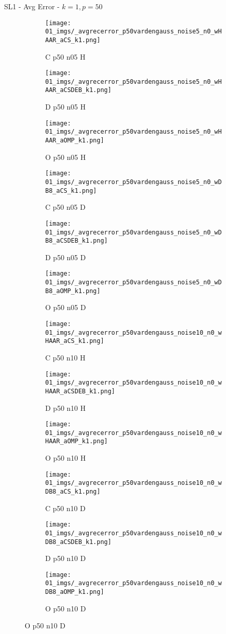\begin{frame}{SL1 - Avg Error - $k=1,p=50$}{}
\begin{figure}
\begin{subfigure}{0.13\textwidth}
\texttt{[image: 01\_imgs/\_avgrecerror\_p50vardengauss\_noise5\_n0\_wHAAR\_aCS\_k1.png]}
\caption*{\tiny C p50 n05 H}
\end{subfigure}
\begin{subfigure}{0.13\textwidth}
\texttt{[image: 01\_imgs/\_avgrecerror\_p50vardengauss\_noise5\_n0\_wHAAR\_aCSDEB\_k1.png]}
\caption*{\tiny D p50 n05 H}
\end{subfigure}
\begin{subfigure}{0.13\textwidth}
\texttt{[image: 01\_imgs/\_avgrecerror\_p50vardengauss\_noise5\_n0\_wHAAR\_aOMP\_k1.png]}
\caption*{\tiny O p50 n05 H}
\end{subfigure}
\begin{subfigure}{0.13\textwidth}
\texttt{[image: 01\_imgs/\_avgrecerror\_p50vardengauss\_noise5\_n0\_wDB8\_aCS\_k1.png]}
\caption*{\tiny C p50 n05 D}
\end{subfigure}
\begin{subfigure}{0.13\textwidth}
\texttt{[image: 01\_imgs/\_avgrecerror\_p50vardengauss\_noise5\_n0\_wDB8\_aCSDEB\_k1.png]}
\caption*{\tiny D p50 n05 D}
\end{subfigure}
\begin{subfigure}{0.13\textwidth}
\texttt{[image: 01\_imgs/\_avgrecerror\_p50vardengauss\_noise5\_n0\_wDB8\_aOMP\_k1.png]}
\caption*{\tiny O p50 n05 D}
\end{subfigure}

\vspace{5pt}

\begin{subfigure}{0.13\textwidth}
\texttt{[image: 01\_imgs/\_avgrecerror\_p50vardengauss\_noise10\_n0\_wHAAR\_aCS\_k1.png]}
\caption*{\tiny C p50 n10 H}
\end{subfigure}
\begin{subfigure}{0.13\textwidth}
\texttt{[image: 01\_imgs/\_avgrecerror\_p50vardengauss\_noise10\_n0\_wHAAR\_aCSDEB\_k1.png]}
\caption*{\tiny D p50 n10 H}
\end{subfigure}
\begin{subfigure}{0.13\textwidth}
\texttt{[image: 01\_imgs/\_avgrecerror\_p50vardengauss\_noise10\_n0\_wHAAR\_aOMP\_k1.png]}
\caption*{\tiny O p50 n10 H}
\end{subfigure}
\begin{subfigure}{0.13\textwidth}
\texttt{[image: 01\_imgs/\_avgrecerror\_p50vardengauss\_noise10\_n0\_wDB8\_aCS\_k1.png]}
\caption*{\tiny C p50 n10 D}
\end{subfigure}
\begin{subfigure}{0.13\textwidth}
\texttt{[image: 01\_imgs/\_avgrecerror\_p50vardengauss\_noise10\_n0\_wDB8\_aCSDEB\_k1.png]}
\caption*{\tiny D p50 n10 D}
\end{subfigure}
\begin{subfigure}{0.13\textwidth}
\texttt{[image: 01\_imgs/\_avgrecerror\_p50vardengauss\_noise10\_n0\_wDB8\_aOMP\_k1.png]}
\caption*{\tiny O p50 n10 D}
\end{subfigure}


\end{figure}
\end{frame}
